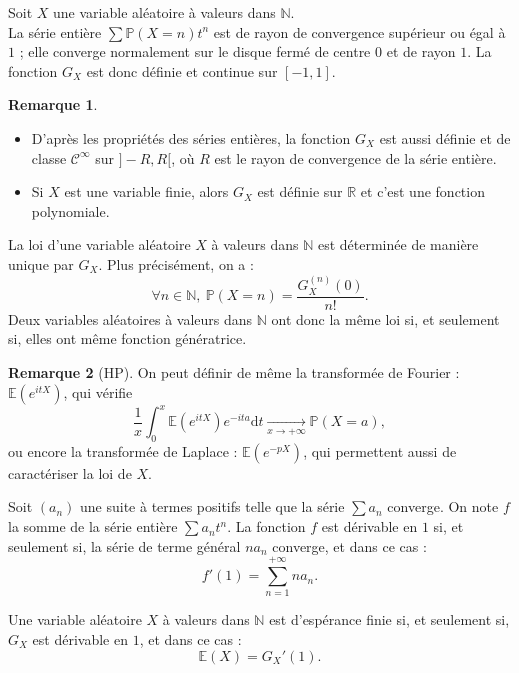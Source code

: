 \documentclass[french]{article}
\renewcommand{\P}{\mathbb{P}}
\newcommand{\N}{\mathbb{N}}
\newcommand{\R}{\mathbb{R}}
\newcommand{\E}{\mathbb{E}}
\renewcommand{\d}{\text{d}}
\theoremstyle{plain}
\theoremstyle{definition}
\newtheorem*{rmq}{Remarque}
\theoremstyle{remark}
\begin{document}
\begin{prop}%
	Soit $X$ une variable aléatoire à valeurs dans $\N$.\\
	La série entière $\displaystyle\sum\P(X=n)t^n$ est de rayon de convergence supérieur ou égal à $1$ ; elle converge normalement sur le disque fermé de centre $0$ et de rayon $1$. La fonction $G_X$ est donc définie et continue sur $[-1,1]$.
\end{prop}

\begin{rmq}
	\begin{itemize}
		\item D'après les propriétés des séries entières, la fonction $G_X$ est aussi définie et de classe $\mathcal{C}^\infty$ sur $]-R,R[$, où $R$ est le rayon de convergence de la série entière.
		\item Si $X$ est une variable finie, alors $G_X$ est définie sur $\R$ et c'est une fonction polynomiale.
	\end{itemize}
\end{rmq}

\begin{prop}%
	La loi d'une variable aléatoire $X$ à valeurs dans $\N$ est déterminée de manière unique par $G_X$. Plus précisément, on a :
	$$\forall n\in\N,\ \P(X=n)=\frac{G_X^{(n)}(0)}{n!}.$$
	Deux variables aléatoires à valeurs dans $\N$ ont donc la même loi si, et seulement si, elles ont même fonction génératrice.
\end{prop}

\begin{rmq}[HP]
	On peut définir de même la transformée de Fourier : $\E(e^{itX})$, qui vérifie $$\frac{1}{x}\int_{0}^{x}\E(e^{itX})e^{-ita}\d t\xrightarrow[x\to+\infty]{}\P(X=a),$$ ou encore la transformée de Laplace : $\E(e^{-pX})$, qui permettent aussi de caractériser la loi de $X$.
\end{rmq}

\begin{lem}%
	Soit $(a_n)$ une suite à termes positifs telle que la série $\displaystyle\sum a_n$ converge. On note $f$ la somme de la série entière $\displaystyle\sum a_nt^n$. La fonction $f$ est dérivable en $1$ si, et seulement si, la série de terme général $na_n$ converge, et dans ce cas : 
	$$f'(1)=\sum_{n=1}^{+\infty}na_n.$$
\end{lem}

\begin{thm}%
	Une variable aléatoire $X$ à valeurs dans $\N$ est d'espérance finie si, et seulement si, $G_X$ est dérivable en $1$, et dans ce cas : $$\E(X)=G_X'(1).$$
\end{thm}
\end{document}
